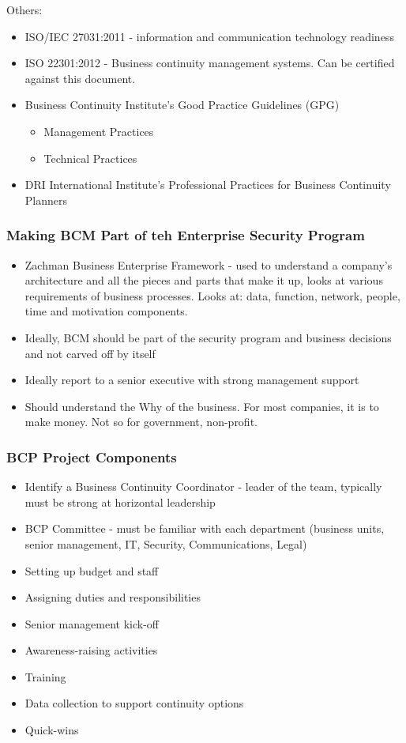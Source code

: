 \documentclass[11pt]{article}
\begin{document}
Others:
\begin{itemize}
\item ISO/IEC 27031:2011 - information and communication technology readiness
\item ISO 22301:2012 - Business continuity management systems. Can be certified against this document.
\item Business Continuity Institute's Good Practice Guidelines (GPG)
\begin{itemize}
\item Management Practices
\item Technical Practices
\end{itemize}
\item DRI International Institute's Professional Practices for Business Continuity Planners
\end{itemize}

\subsubsection{Making BCM Part of teh Enterprise Security Program}
\label{sec:org78dec95}
\begin{itemize}
\item Zachman Business Enterprise Framework - used to understand a company's architecture and all the pieces and parts that make it up, looks at various requirements of business processes. Looks at: data, function, network, people, time and motivation components.
\item Ideally, BCM should be part of the security program and business decisions and not carved off by itself
\item Ideally report to a senior executive with strong management support
\item Should understand the Why of the business. For most companies, it is to make money. Not so for government, non-profit.
\end{itemize}
\subsubsection{BCP Project Components}
\label{sec:org9a0d6c7}
\begin{itemize}
\item Identify a Business Continuity Coordinator - leader of the team, typically must be strong at horizontal leadership
\item BCP Committee - must be familiar with each department (business units, senior management, IT, Security, Communications, Legal)
\item Setting up budget and staff
\item Assigning duties and responsibilities
\item Senior management kick-off
\item Awareness-raising activities
\item Training
\item Data collection to support continuity options
\item Quick-wins
\end{itemize}
\end{document}

